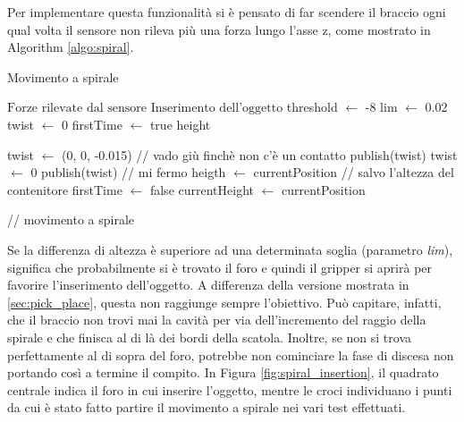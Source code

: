 Per implementare questa funzionalit\`{a} si \`{e} pensato di far scendere il braccio ogni qual volta il sensore non rileva pi\`{u}
una forza lungo l'asse z, come mostrato in Algorithm \ref{algo:spiral}. 
\newpage
\begin{algorithm}[H]
    \caption{Movimento a spirale}\label{algo:spiral}
    \begin{algorithmic}[1]
        \Require $\text{Forze rilevate dal sensore}$
        \Ensure $\text{Inserimento dell'oggetto}$
        \State threshold $\gets$ -8
        \State lim $\gets$ 0.02
        \State twist $\gets$ 0
        \State firstTime $\gets$ true
        \State height
        
        \Repeat 
                \State twist $\gets$ (0, 0, -0.015) // vado gi\`{u} finch\`{e} non c'\`{e} un contatto
                \State publish(twist)
            \EndWhile
            \State twist $\gets$ 0
            \State publish(twist) // mi fermo
                \State heigth $\gets$ currentPosition // salvo l'altezza del contenitore
                \State firstTime $\gets$ false
            \EndIf
            \State currentHeight $\gets$ currentPosition

                // movimento a spirale
            \EndWhile
    \end{algorithmic}
    \end{algorithm}
Se la differenza di altezza \`{e} superiore ad una determinata soglia (parametro \textit{lim}), significa che probabilmente si \`{e} 
trovato il foro e quindi il gripper si aprir\`{a} per favorire l'inserimento dell'oggetto. 
A differenza della versione mostrata in \ref{sec:pick_place}, questa non raggiunge sempre l'obiettivo. 
Pu\`{o} capitare, infatti, che il braccio non trovi mai la cavit\`{a} per via dell'incremento del raggio della spirale e che finisca 
al di l\`{a} dei bordi della scatola. Inoltre, se non si trova perfettamente al di sopra del foro, potrebbe non cominciare la 
fase di discesa non portando cos\`{i} a termine il compito. 
In Figura \ref{fig:spiral_insertion}, il quadrato centrale indica il foro in cui inserire l'oggetto, mentre le croci individuano i 
punti da cui \`{e} stato fatto partire il movimento a spirale nei vari test effettuati. 
